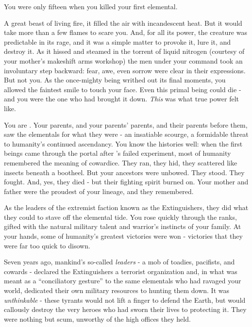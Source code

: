 \documentclass[char]{elementals}
\begin{document}
\name{\cDema{}}

You were only fifteen when you killed your first elemental. 

A great beast of living fire, it filled the air with incandescent heat. But it would take more than a few flames to scare you. And, for all its power, the creature was predictable in its rage, and it was a simple matter to provoke it, lure it, and destroy it. As it hissed and steamed in the torrent of liquid nitrogen (courtesy of your mother's makeshift arms workshop) the men under your command took an involuntary step backward: fear, awe, even sorrow were clear in their expressions. But not you. As the once-mighty being writhed out its final moments, you allowed the faintest smile to touch your face. Even this primal being could die - and you were the one who had brought it down. \emph{This} was what true power felt like.

You are \cDema{\intro{}}. Your parents, and your parents' parents, and their parents before them, saw the elementals for what they were - an insatiable scourge, a formidable threat to humanity's continued ascendancy. You know the histories well: when the first beings came through the portal after \cGrandfather{\intro{}}'s failed experiment, most of humanity remembered the meaning of cowardice. They ran, they hid, they scattered like insects beneath a bootheel. But your ancestors were unbowed. They stood. They fought. And, yes, they died - but their fighting spirit burned on. Your mother and father were the proudest of your lineage, and they remembered.

As the leaders of the extremist faction known as the Extinguishers, they did what they could to stave off the elemental tide. You rose quickly through the ranks, gifted with the natural military talent and warrior's instincts of your family. At your hands, some of humanity's greatest victories were won - victories that they were far too quick to disown. 

Seven years ago, mankind's so-called \emph{leaders} - a mob of toadies, pacifists, and cowards - declared the Extinguishers a terrorist organization and, in what was meant as a ``conciliatory gesture'' to the same elementals who had ravaged your world, dedicated their own military resources to hunting them down. It was \emph{unthinkable} - these tyrants would not lift a finger to defend the Earth, but would callously destroy the very heroes who had sworn their lives to protecting it. They were nothing but scum, unworthy of the high offices they held.
\end{document}

